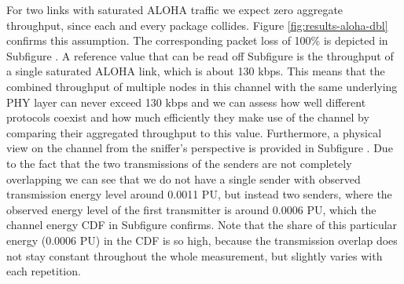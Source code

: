 For two links with saturated ALOHA traffic we expect zero aggregate throughput, since each and every package collides. Figure \ref{fig:results-aloha-dbl}  confirms this assumption. The corresponding packet loss of 100\% is depicted in Subfigure . A reference value that can be read off Subfigure  is the throughput of a single saturated ALOHA link, which is about 130 kbps. This means that the combined throughput of multiple nodes in this channel with the same underlying PHY layer can never exceed 130 kbps and we can assess how well different protocols coexist and how much efficiently they make use of the channel by comparing their aggregated throughput to this value. Furthermore, a physical view on the channel from the sniffer's perspective is provided in Subfigure . Due to the fact that the two transmissions of the senders are not completely overlapping we can see that we do not have a single sender with observed transmission energy level around 0.0011 PU, but instead two senders, where the observed energy level of the first transmitter is around 0.0006 PU, which the channel energy CDF in Subfigure  confirms. Note that the share of this particular energy (0.0006 PU) in the CDF is so high, because the transmission overlap does not stay constant throughout the whole measurement, but slightly varies with each repetition.
